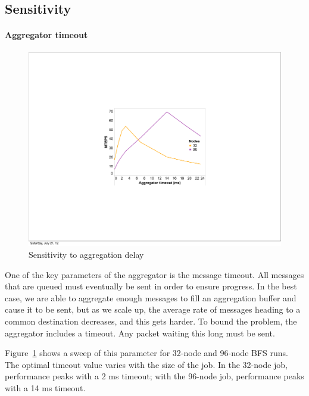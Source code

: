\subsection{Sensitivity}

\paragraph{Aggregator timeout}

\begin{figure}[htb]
\begin{center}
  \includegraphics[width=0.95\columnwidth]{figs/bfs_sweep_flushticks}
\begin{minipage}{0.95\columnwidth}
  \caption{\label{fig:bfs-sweep-flushticks} Sensitivity to aggregation delay}
\end{minipage}
\vspace{-3ex}
\end{center}
\end{figure}


One of the key parameters of the aggregator is the message
timeout. All messages that are queued must eventually be sent in order
to ensure progress. In the best case, we are able to aggregate enough
messages to fill an aggregation buffer and cause it to be sent, but as
we scale up, the average rate of messages heading to a common
destination decreases, and this gets harder. To bound the problem, the
aggregator includes a timeout. Any packet waiting this long must be sent.

Figure~\ref{fig:bfs-sweep-flushticks} shows a sweep of this parameter
for 32-node and 96-node BFS runs. The optimal timeout value varies
with the size of the job. In the 32-node job, performance peaks with a
2 ms timeout; with the 96-node job, performance peaks with a 14 ms
timeout.

